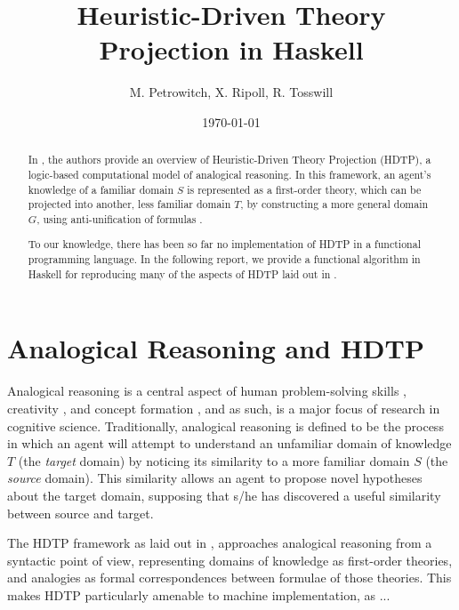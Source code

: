 \documentclass[12pt,a4paper]{article}
\title{Heuristic-Driven Theory Projection in Haskell}
\author{M. Petrowitch, X. Ripoll, R. Tosswill}
\date{\today}
\begin{document}
\maketitle

\begin{abstract}
In \cite{Schmidt-2014}, the authors provide an overview of Heuristic-Driven
Theory Projection (HDTP), a logic-based computational model of analogical
reasoning. In this framework, an agent's knowledge of a familiar domain $S$ is
represented as a first-order theory, which can be projected into another, less
familiar domain $T$, by constructing a more general domain $G$, using
anti-unification of formulas \cite{Plotkin70}. 

To our knowledge, there has been so far no implementation of HDTP in a functional programming language. In the following report, we provide a functional algorithm in Haskell for reproducing many of the aspects of HDTP laid out in \cite{Schmidt-2014}.
\end{abstract}

\vfill

\tableofcontents



\clearpage


\section{Analogical Reasoning and HDTP}
Analogical reasoning is a central aspect of human problem-solving skills
\cite{gentner}, creativity \cite{Besold2015GeneralizeAB}, and concept
formation \cite{hofstadter2013surfaces}, and as such, is a major focus of
research in cognitive science. Traditionally, analogical reasoning is defined to be the process in which an agent will attempt to understand an unfamiliar domain of knowledge $T$ (the \textit{target} domain) by noticing its similarity to a more familiar domain $S$ (the \textit{source} domain). This similarity allows an agent to propose novel hypotheses about the target domain, supposing that s/he has discovered a useful similarity between source and target.

The HDTP framework as laid out in \cite{Schmidt-2014}, approaches analogical reasoning from a syntactic point of view, representing domains of knowledge as first-order theories, and analogies as formal correspondences between formulae of those theories. This makes HDTP particularly amenable to machine implementation, as ... 
\end{document}
